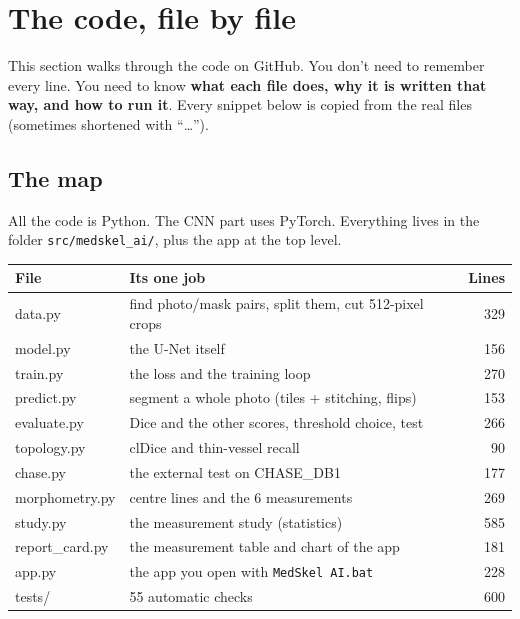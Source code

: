 \section{The code, file by file}

This section walks through the code on GitHub. You don't need to remember every line. You need to know \textbf{what each file does, why it is written that way, and how to run it}. Every snippet below is copied from the real files (sometimes shortened with ``\dots'').

\subsection{The map}
All the code is Python. The CNN part uses PyTorch. Everything lives in the folder \texttt{src/medskel\_ai/}, plus the app at the top level.

\begin{center}
\small
\begin{tabular}{>{\ttfamily}p{3.3cm} p{6.6cm} r}
\toprule
\textrm{\textbf{File}} & \textbf{Its one job} & \textbf{Lines} \\
\midrule
data.py & find photo/mask pairs, split them, cut 512-pixel crops & 329 \\
model.py & the U-Net itself & 156 \\
train.py & the loss and the training loop & 270 \\
predict.py & segment a whole photo (tiles + stitching, flips) & 153 \\
evaluate.py & Dice and the other scores, threshold choice, test & 266 \\
topology.py & clDice and thin-vessel recall & 90 \\
chase.py & the external test on CHASE\_DB1 & 177 \\
morphometry.py & centre lines and the 6 measurements & 269 \\
study.py & the measurement study (statistics) & 585 \\
report\_card.py & the measurement table and chart of the app & 181 \\
app.py & the app you open with \texttt{MedSkel AI.bat} & 228 \\
tests/ & 55 automatic checks & 600 \\
\bottomrule
\end{tabular}
\end{center}

